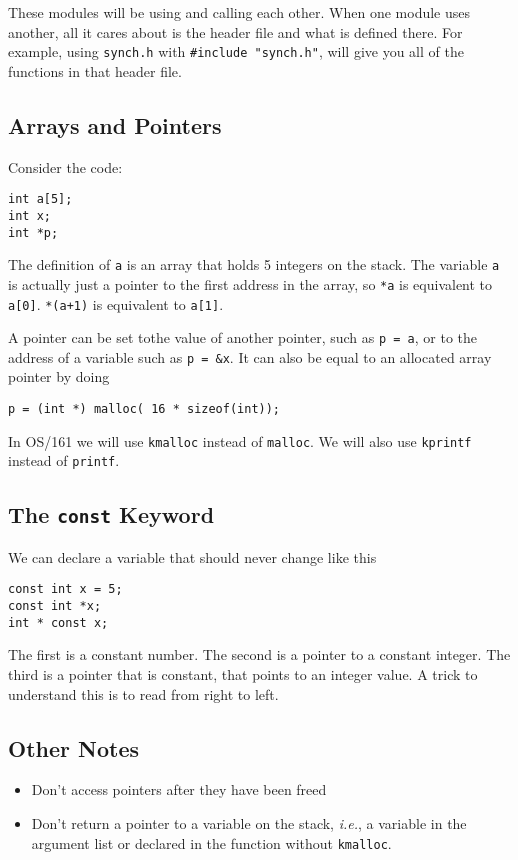 \documentclass[12pt]{article}
\begin{document}
These modules will be using and calling each other. When one module uses
another, all it cares about is the header file and what is defined there. For
example, using \texttt{synch.h} with \texttt{\#include "synch.h"}, will give you
all of the functions in that header file.

\subsection{Arrays and Pointers}

Consider the code:
\begin{verbatim}
int a[5];
int x;
int *p;
\end{verbatim}

The definition of \texttt{a} is an array that holds 5 integers on the stack.
The variable \texttt{a} is actually just a pointer to the first address in the
array, so \texttt{*a} is equivalent to \texttt{a[0]}. \texttt{*(a+1)} is
equivalent to \texttt{a[1]}.

A pointer can be set tothe value of another pointer, such as \texttt{p = a}, or
to the address of a variable such as \texttt{p = \&x}. It can also be equal to
an allocated array pointer by doing
\begin{verbatim}
p = (int *) malloc( 16 * sizeof(int));
\end{verbatim}

In OS/161 we will use \texttt{kmalloc} instead of \texttt{malloc}.  We will also
use \texttt{kprintf} instead of \texttt{printf}.

\subsection{The \texttt{const} Keyword}

We can declare a variable that should never change like this
\begin{verbatim}
const int x = 5;
const int *x;
int * const x;
\end{verbatim}
The first is a constant number. The second is a pointer to a constant integer.
The third is a pointer that is constant, that points to an integer value. A
trick to understand this is to read from right to left.

\subsection{Other Notes}

\begin{itemize}
    \item Don't access pointers after they have been freed
    \item Don't return a pointer to a variable on the stack, \textit{i.e.}, a
        variable in the argument list or declared in the function without
        \texttt{kmalloc}.
\end{itemize}
\end{document}
